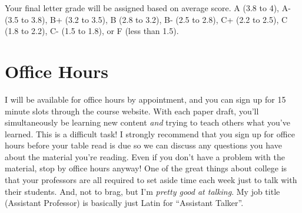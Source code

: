 \documentclass[11pt, letterpaper]{article}
\begin{document}
Your final letter grade will be assigned based on average score. A (3.8 to 4), A- (3.5 to 3.8), B+ (3.2 to 3.5), B (2.8 to 3.2), B- (2.5 to 2.8), C+ (2.2 to 2.5), C (1.8 to 2.2), C- (1.5 to 1.8), or F (less than 1.5).




\section*{Office Hours}

I will be available for office hours by appointment, and you can sign up for 15 minute slots through the course website. With each paper draft, you'll simultaneously be learning new content \textit{and} trying to teach others what you've learned. This is a difficult task! I strongly recommend that you sign up for office hours before your table read is due so we can discuss any questions you have about the material you're reading. Even if you don't have a problem with the material, stop by office hours anyway! One of the great things about college is that your professors are all required to set aside time each week just to talk with their students. And, not to brag, but I'm \textit{pretty good at talking}. My job title (Assistant Professor) is basically just Latin for ``Assistant Talker''.
\end{document}

